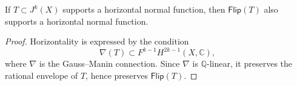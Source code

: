 \begin{lemma}
If $T \subset J^k(X)$ supports a horizontal normal function, then
$\mathsf{Flip}(T)$ also supports a horizontal normal function.
\end{lemma}

\begin{proof}
Horizontality is expressed by the condition
\[
\nabla(T) \subset F^{k-1} H^{2k-1}(X,\mathbb{C}),
\]
where $\nabla$ is the Gauss--Manin connection.
Since $\nabla$ is $\mathbb{Q}$-linear, it preserves the rational envelope of $T$,
hence preserves $\mathsf{Flip}(T)$.
\end{proof}

